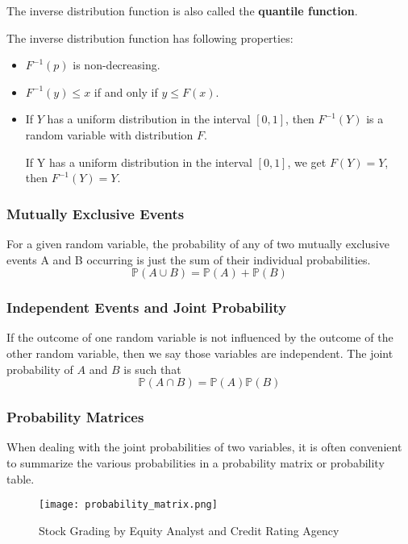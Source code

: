 The inverse distribution function is also called the \textbf{quantile function}.

The inverse distribution function has following properties:

\begin{itemize}
    \item $F^{-1}(p)$ is non-decreasing.
    \item $F^{-1}(y) \leq x $ if and only if $y\leq F(x)$.
    \item If $Y$ has a uniform distribution in the interval $[0, 1]$, then $F^{-1}(Y)$ is a random variable with distribution $F$.
    \begin{remark}
    If Y has a uniform distribution in the interval $[0, 1]$, we get $F(Y) = Y$, then $F^{-1}(Y) = Y$.
    \end{remark}
\end{itemize}

\subsubsection{Mutually Exclusive Events}

For a given random variable, the probability of any of two mutually exclusive events A and B occurring is just the sum of their individual probabilities.
\[
\mathbb{P}(A\cup B) = \mathbb{P}{(A)} + \mathbb{P}{(B)}    
\]

\subsubsection{Independent Events and Joint Probability}

If the outcome of one random variable is not influenced by the outcome of the other random variable, then we say those variables are independent. The joint probability of $A$ and $B$ is such that
\[
\mathbb{P}(A\cap B) = \mathbb{P}{(A)} \mathbb{P}{(B)}    
\]

\subsubsection{Probability Matrices}
When dealing with the joint probabilities of two variables, it is often convenient to summarize the various probabilities in a probability matrix or probability table.

\begin{example}
\begin{figure}[!ht]
	\centering
	\texttt{[image: probability\_matrix.png]}
	\caption{Stock Grading by Equity Analyst and Credit Rating
    Agency}
\end{figure}
\end{example}

